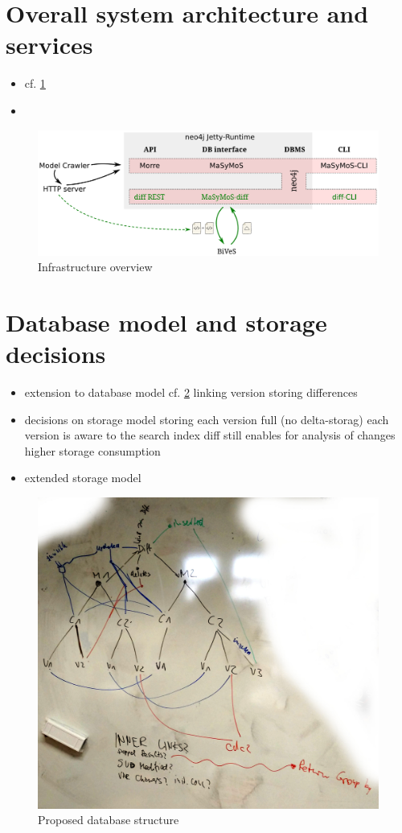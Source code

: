 \section{Overall system architecture and services}
\begin{itemize}
	\item cf. \ref{fig:system-overview}
	\item {}
\end{itemize}

\begin{figure}[h]
	\includegraphics[width=\textwidth]{resources/system-overview-matrix.pdf}
	\caption{Infrastructure overview}
	\label{fig:system-overview}
\end{figure}

\section{Database model and storage decisions}
\begin{itemize}
\item extension to database model cf. \ref{fig:db-model}
	\subitem linking version
	\subitem storing differences
\item decisions on storage model
	\subitem storing each version full (no delta-storag)
	\subitem each version is aware to the search index
	\subitem diff still enables for analysis of changes
	\subitem higher storage consumption
\item extended storage model
\end{itemize}

\begin{figure}[h]
	\includegraphics[width=\textwidth]{resources/db_structure.jpg}
	\caption{Proposed database structure}
	\label{fig:db-model}
\end{figure}
